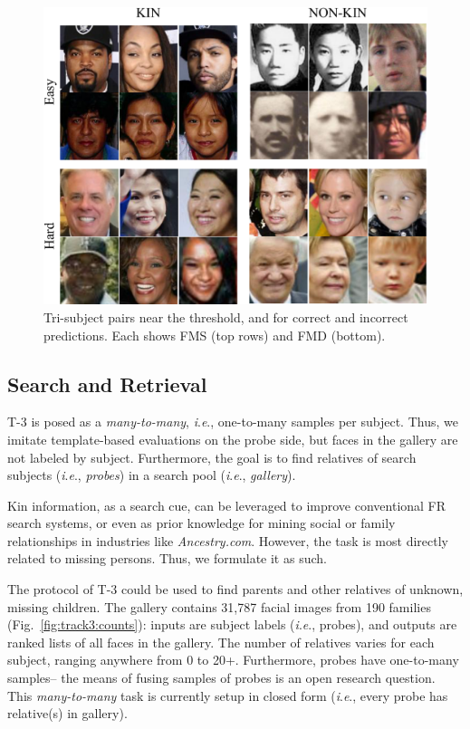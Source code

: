 \documentclass[letterpaper, 10 pt, conference]{ieeeconf}
\newcommand{\ie}{\textit{i}.\textit{e}., }
\begin{document}
\begin{figure}[t!]
    \centering
    \includegraphics[width = .9\linewidth]{figures/tri-montage-crop.pdf}
    \caption{Tri-subject pairs near the threshold, and for correct and incorrect predictions. Each shows FMS (top rows) and FMD (bottom).}
    \label{fig:track2:montage}
\end{figure}



\subsection{Search and Retrieval}\label{sec:search}
T-3 is posed as a \textit{many-to-many}, \ie one-to-many samples per subject. Thus, we imitate template-based evaluations on the probe side, but faces in the gallery are not labeled by subject. Furthermore, the goal is to find relatives of search subjects (\ie \textit{probes}) in a search pool (\ie \textit{gallery}).





Kin information, as a search cue, can be leveraged to improve conventional FR search systems, or even as prior knowledge for mining social or family relationships in industries like \textit{Ancestry.com}. However, the task is most directly related to missing persons. Thus, we formulate it as such.




The protocol of T-3 could be used to find parents and other relatives of unknown, missing children. The gallery contains 31,787 facial images from 190 families (Fig.~\ref{fig:track3:counts}): inputs are subject labels (\ie probes), and outputs are ranked lists of all faces in the gallery. The number of relatives varies for each subject, ranging anywhere from 0 to 20+. Furthermore, probes have one-to-many samples-- the means of fusing samples of probes is an open research question. This \textit{many-to-many} task is currently setup in closed form (\ie every probe has relative(s) in gallery).
\end{document}
